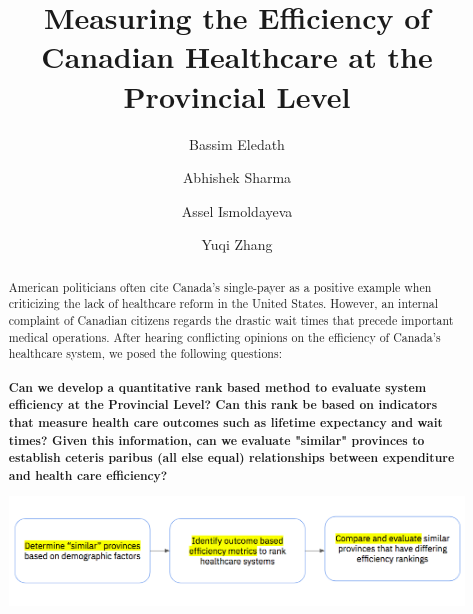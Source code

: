 \documentclass[preprint,12pt]{elsarticle}
\begin{document}
\begin{frontmatter}


\title{Measuring the Efficiency of Canadian Healthcare at the Provincial Level}



\author{Bassim Eledath}
\author{Abhishek Sharma}
\author{Assel Ismoldayeva}
\author{Yuqi Zhang}
\address{San Francisco, California}

\begin{abstract}
American politicians often cite Canada's single-payer as a positive example when criticizing the lack of healthcare reform in the United States. However, an internal complaint of Canadian citizens regards the drastic wait times that precede important medical operations. After hearing conflicting opinions on the efficiency of Canada's healthcare system, we posed the following questions:
\\ \\ 
\textbf{Can we develop a quantitative rank based method to evaluate system efficiency at the Provincial Level? Can this rank be based on indicators that measure health care outcomes such as lifetime expectancy and wait times? Given this information, can we evaluate "similar" provinces to establish ceteris paribus (all else equal) relationships between expenditure and health care efficiency?}
 


\begin{center}
    \includegraphics[scale=0.4]{images/screenshot.png}
\end{center} 


\end{abstract}
\end{frontmatter}
\end{document}
